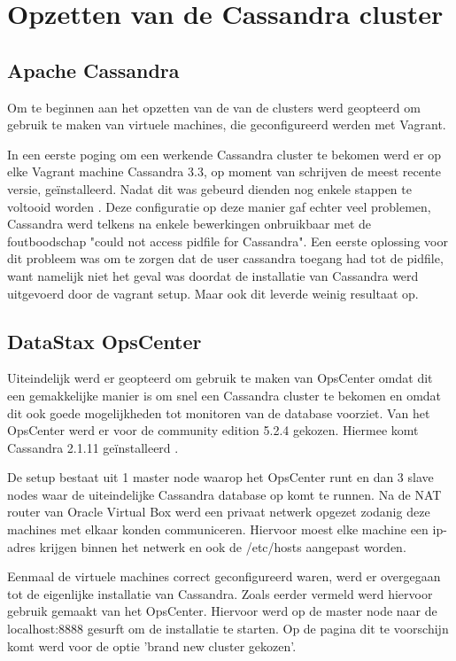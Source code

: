 \chapter{Opzetten van de Cassandra cluster}
\label{ch:cassandra_cluster}

\section{Apache Cassandra}
Om te beginnen aan het opzetten van de van de clusters werd geopteerd om gebruik te maken van virtuele machines, die geconfigureerd werden met Vagrant.

In een eerste poging om een werkende Cassandra cluster te bekomen werd er op elke Vagrant machine Cassandra 3.3, op moment van schrijven de meest recente versie, geïnstalleerd.
Nadat dit was gebeurd dienden nog enkele stappen te voltooid worden \citep{DataStax2016}.
Deze configuratie op deze manier gaf echter veel problemen, Cassandra werd telkens na enkele bewerkingen onbruikbaar met de foutboodschap "could not access pidfile for Cassandra".
Een eerste oplossing voor dit probleem was om te zorgen dat de user cassandra toegang had tot de pidfile, want namelijk niet het geval was doordat de installatie van Cassandra werd uitgevoerd door de vagrant setup.
Maar ook dit leverde weinig resultaat op.

\section{DataStax OpsCenter}

Uiteindelijk werd er geopteerd om gebruik te maken van OpsCenter omdat dit een gemakkelijke manier is om snel een Cassandra cluster te bekomen en omdat dit ook goede mogelijkheden tot monitoren van de database voorziet.
Van het OpsCenter werd er voor de community edition 5.2.4 gekozen.
Hiermee komt Cassandra 2.1.11 geïnstalleerd \citep{Cantoni2016}.

De setup bestaat uit 1 master node waarop het OpsCenter runt en dan 3 slave nodes waar de uiteindelijke Cassandra database op komt te runnen.
Na de NAT router van Oracle Virtual Box werd een privaat netwerk opgezet zodanig deze machines met elkaar konden communiceren.
Hiervoor moest elke machine een ip-adres krijgen binnen het netwerk en ook de /etc/hosts aangepast worden.

Eenmaal de virtuele machines correct geconfigureerd waren, werd er overgegaan tot de eigenlijke installatie van Cassandra.
Zoals eerder vermeld werd hiervoor gebruik gemaakt van het OpsCenter.
Hiervoor werd op de master node naar de localhost:8888 gesurft om de installatie te starten. Op de pagina dit te voorschijn komt werd voor de optie 'brand new cluster gekozen'.

